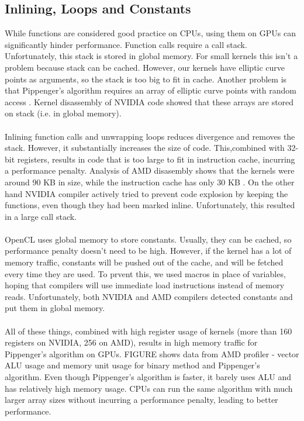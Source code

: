 \subsection{Inlining, Loops and Constants}

While functions are considered good practice on CPUs, using them on GPUs can significantly hinder performance. Function calls require a call stack. Unfortunately, this stack is stored in global memory. For small kernels this isn't a problem because stack can be cached. However, our kernels have elliptic curve points as arguments, so the stack is too big to fit in cache. Another problem is that Pippenger's algorithm requires an array of elliptic curve points with random access \cite{nvidiaarrayindexing}. Kernel disassembly of NVIDIA code showed that these arrays are stored on stack (i.e. in global memory).\\
\\
Inlining function calls and unwrapping loops reduces divergence and removes the stack. However, it substantially increases the size of code. This,combined with 32-bit registers, results in code that is too large to fit in instruction cache, incurring a performance penalty. Analysis of AMD disasembly shows that the kernels were around 90 KB in size, while the instruction cache has only 30 KB \cite{amdgcnarch}. On the other hand NVIDIA compiler actively tried to prevent code explosion by keeping the functions, even though they had been marked inline. Unfortunately, this resulted in a large call stack.\\
\\
OpenCL uses global memory to store constants. Usually, they can be cached, so performance penalty doesn't need to be high. However, if the kernel has a lot of memory traffic, constants will be pushed out of the cache, and will be fetched every time they are used. To prvent this, we used macros in place of variables, hoping that compilers will use immediate load instructions instead of memory reads. Unfortunately, both NVIDIA and AMD compilers detected constants and put them in global memory.\\
\\
All of these things, combined with high register usage of kernels (more than 160 registers on NVIDIA, 256 on AMD), results in high memory traffic for Pippenger's algorithm on GPUs. FIGURE shows data from AMD profiler - vector ALU usage and memory unit usage for binary method and Pippenger's algorithm. Even though Pippenger's algorithm is faster, it barely uses ALU and has relatively high memory usage. CPUs can run the same algorithm with much larger array sizes without incurring a performance penalty, leading to better performance.